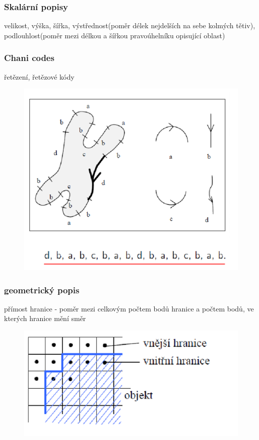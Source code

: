 \subsubsection{Skalární popisy}
velikost, výška, šířka, výstřednost(poměr délek nejdelších na sebe kolmých tětiv), podlouhlost(poměr mezi délkou a šířkou pravoúhelníku opisující oblast)\\

\subsubsection{Chani codes}
řetězení, řetězové kódy\\
\begin{figure}[H]
    \includegraphics[scale = 0.3]{images/chain_codes.png}
\end{figure}
\subsubsection{geometrický popis}
přímost hranice - poměr mezi celkovým počtem bodů hranice a počtem bodů, ve kterých hranice mění směr\\
\begin{figure}[H]
    \includegraphics[scale = 0.2]{images/geometricky_popis.png}
\end{figure}
\newpage
